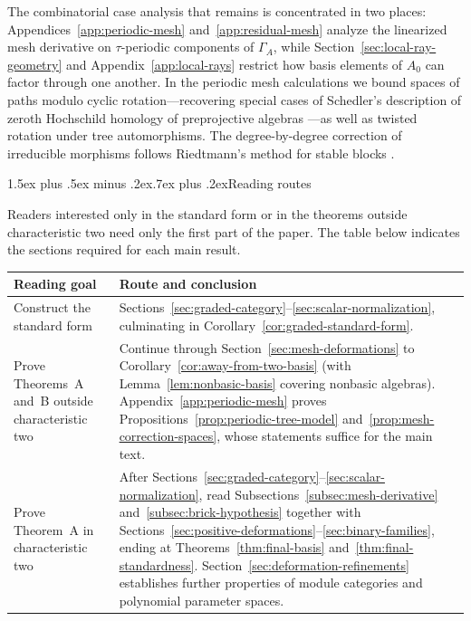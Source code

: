 \documentclass[a4paper,reqno,11pt]{amsart}
\makeatletter
\renewcommand{\subsection}{\@startsection{subsection}{2}%
  {\z@}{1.5ex plus .5ex minus .2ex}{.7ex plus .2ex}{\normalfont\bfseries}}
\theoremstyle{definition}
\makeatother
\begin{document}
The combinatorial case analysis that remains is concentrated in two places:
Appendices~\ref{app:periodic-mesh} and~\ref{app:residual-mesh} analyze the
linearized mesh derivative on $\tau$-periodic components of $\Gamma_A$,
while Section~\ref{sec:local-ray-geometry} and
Appendix~\ref{app:local-rays} restrict how basis elements of $A_0$ can
factor through one another. In the periodic mesh calculations we bound spaces
of paths modulo cyclic rotation—recovering special cases of Schedler's
description of zeroth Hochschild homology of preprojective algebras
\cite[Theorem~13.1.1]{Schedler}—as well as twisted rotation under tree
automorphisms. The degree-by-degree correction of irreducible morphisms
follows Riedtmann's method for stable blocks \cite{Riedtmann1984}.

\subsection{Reading routes}
\label{subsec:reading-routes}

Readers interested only in the standard form or in the theorems outside
characteristic two need only the first part of the paper. The table below
indicates the sections required for each main result.

\begin{center}
\small
\renewcommand{\arraystretch}{1.15}
\begin{tabularx}{\textwidth}{@{}>{\raggedright\arraybackslash}p{}
 >{\raggedright\arraybackslash}X@{}}
\toprule
Reading goal & Route and conclusion \\
\midrule
Construct the standard form &
Sections~\ref{sec:graded-category}--\ref{sec:scalar-normalization},
culminating in Corollary~\ref{cor:graded-standard-form}. \\
\addlinespace
Prove Theorems~A and~B outside characteristic two &
Continue through Section~\ref{sec:mesh-deformations} to
Corollary~\ref{cor:away-from-two-basis} (with Lemma~\ref{lem:nonbasic-basis}
covering nonbasic algebras). Appendix~\ref{app:periodic-mesh} proves
Propositions~\ref{prop:periodic-tree-model}
and~\ref{prop:mesh-correction-spaces}, whose statements suffice for the main
text. \\
\addlinespace
Prove Theorem~A in characteristic two &
After Sections~\ref{sec:graded-category}--\ref{sec:scalar-normalization},
read Subsections~\ref{subsec:mesh-derivative}
and~\ref{subsec:brick-hypothesis} together with
Sections~\ref{sec:positive-deformations}--\ref{sec:binary-families}, ending
at Theorems~\ref{thm:final-basis} and~\ref{thm:final-standardness}.
Section~\ref{sec:deformation-refinements} establishes further properties of
module categories and polynomial parameter spaces. \\
\bottomrule
\end{tabularx}
\end{center}
\end{document}
